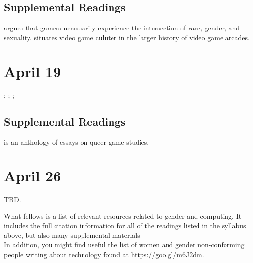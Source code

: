 \documentclass[11pt]{article}
\begin{document}

\subsection{Supplemental Readings}

\cite{Shaw:2015dr} argues that gamers necessarily experience the intersection of race, gender, and sexuality. \cite{Kocurek:2015cg} situates video game culuter in the larger history of video game arcades.

\section{April 19}

; ; ; \cite{Gray:2014uj}

\subsection{Supplemental Readings}

\cite{Ruberg:2017ww} is an anthology of essays on queer game studies.

\section{April 26}

TBD.

\newpage

What follows is a list of relevant resources related to gender and computing. It includes the full citation information for all of the readings listed in the syllabus above, but also many supplemental materials.\\

In addition, you might find useful the list of women and gender non-conforming people writing about technology found at \url{https://goo.gl/m6J2dm}.\\


\nocite{*} 
\printbibliography
\end{document}
